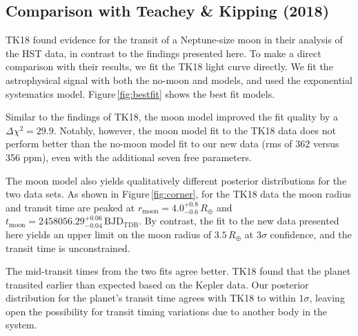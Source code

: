 \documentclass[twocolumn]{aastex62}
\begin{document}
\subsection{Comparison with Teachey \& Kipping (2018)}
TK18 found evidence for the transit of a Neptune-size moon in their analysis of the HST data, in contrast to the findings presented here.  To make a direct comparison with their results, we fit the TK18 light curve directly.  We fit the astrophysical signal with both the no-moon and models, and used the exponential systematics model.  Figure\,\ref{fig:bestfit} shows the best fit models. 


Similar to the findings of TK18, the moon model improved the fit quality by a $\Delta\chi^2 = 29.9$. Notably, however, the moon model fit to the TK18 data does not perform better than the no-moon model fit to our new data (rms of 362 versus 356 ppm), even with the additional seven free parameters.  %

The moon model also yields qualitatively different posterior distributions for the two data sets.  As shown in Figure\,\ref{fig:corner}, for the TK18 data the moon radius and transit time are peaked at $r_\mathrm{moon} = 4.0^{+0.8}_{-0.6}\,R_\oplus$  and $t_\mathrm{moon} =  2458056.29^{+0.06}_{-0.04}\,\mathrm{BJD_{TDB}}$. By contrast, the fit to the new data presented here yields an upper limit on the moon radius of $3.5\,R_\oplus$ at $3\sigma$ confidence, and the transit time is unconstrained.

The mid-transit times from the two fits agree better. TK18 found that the planet transited earlier than expected based on the Kepler data. Our posterior distribution for the planet's transit time agrees with TK18 to within $1\sigma$, leaving open the possibility for transit timing variations due to another body in the system.
\end{document}
